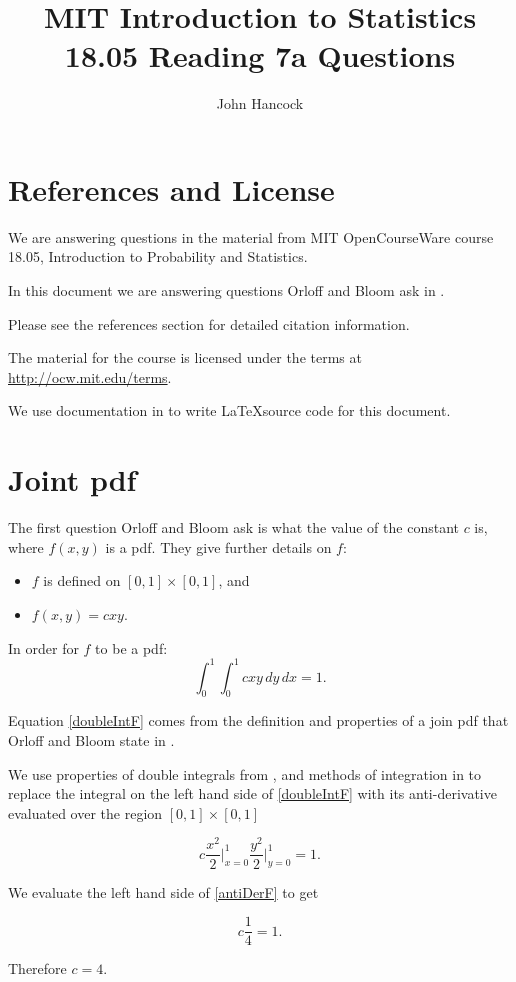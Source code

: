 \documentclass[a4paper,11pt]{article}
\author{John Hancock}
\title{MIT Introduction to Statistics 18.05 Reading 7a Questions}
\begin{document}
\maketitle
\tableofcontents
\section{References and License}
We are answering questions in the material from MIT OpenCourseWare
course 18.05, Introduction to Probability and Statistics.

In this document we are answering questions Orloff and Bloom ask in
\cite{reading7qu}.

Please see the references section for detailed citation information.

The material for the course is licensed under the terms at
\url{http://ocw.mit.edu/terms}.

We use documentation in  to write \LaTeX source code for this
document.

\section{Joint pdf}
The first question Orloff and Bloom ask is what the value of the constant
$c$ is, where $f\left(x, y\right)$ is a pdf.  They give further details
on $f$:
\begin{itemize}
  \item $f$ is defined on $\left[0,1 \right] \times \left[0, 1 \right]$, and
  \item $f \left( x, y \right) = cxy$.
\end{itemize}

In order for $f$ to be a pdf:
\begin{equation}\label{doubleIntF}
  \int_{0}^{1} \int_{0}^{1} cxy \, dy \, dx = 1.
\end{equation}

Equation \ref{doubleIntF} comes from the definition and properties
of a join pdf that Orloff and Bloom state in \cite{reading7}.

We use properties of double integrals from \cite{doubleIntProp}, and
methods of integration in \cite{doubleIntEval} to replace the
integral on the left hand side of \ref{doubleIntF} with its
anti-derivative evaluated over the region
$\left[ 0, 1 \right] \times \left[ 0, 1 \right]$

\begin{equation}\label{antiDerF}
  c \frac{x^2}{2} \bigg\rvert_{x=0}^1 \frac{y^2}{2} \bigg\rvert_{y=0}^1 = 1.
\end{equation}

We evaluate the left hand side of  \ref{antiDerF} to get

\begin{equation}\label{antiDerF}
  c \frac{1}{4}  = 1.
\end{equation}

Therefore $c=4$.


\printbibliography{}
\end{document}
